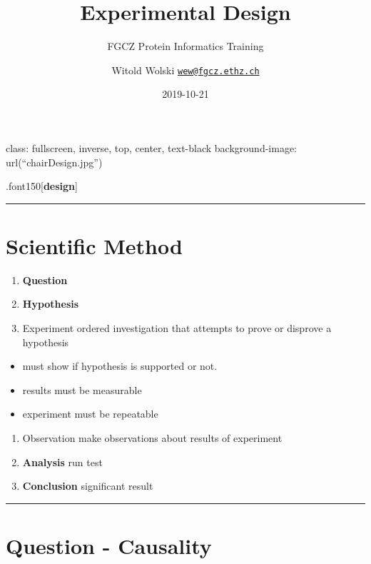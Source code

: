 \documentclass[]{article}
\title{Experimental Design}
\subtitle{FGCZ Protein Informatics Training}
\author{Witold Wolski
\href{mailto:wew@fgcz.ethz.ch}{\nolinkurl{wew@fgcz.ethz.ch}}}
\date{2019-10-21}
\providecommand{\tightlist}{%
  \setlength{\itemsep}{0pt}\setlength{\parskip}{0pt}}
\begin{document}
\maketitle

class: fullscreen, inverse, top, center, text-black background-image:
url(``chairDesign.jpg'')

.font150{[}\textbf{design}{]}

\begin{center}\rule{0.5\linewidth}{\linethickness}\end{center}

\hypertarget{scientific-method}{%
\section{Scientific Method}\label{scientific-method}}

\begin{enumerate}
\def\labelenumi{\arabic{enumi}.}
\tightlist
\item
  \textbf{Question}
\item
  \textbf{Hypothesis}
\item
  Experiment ordered investigation that attempts to prove or disprove a
  hypothesis
\end{enumerate}

\begin{itemize}
\tightlist
\item
  must show if hypothesis is supported or not.
\item
  results must be measurable
\item
  experiment must be repeatable
\end{itemize}

\begin{enumerate}
\def\labelenumi{\arabic{enumi}.}
\setcounter{enumi}{3}
\tightlist
\item
  Observation make observations about results of experiment
\item
  \textbf{Analysis} run test
\item
  \textbf{Conclusion} significant result
\end{enumerate}

\begin{center}\rule{0.5\linewidth}{\linethickness}\end{center}

\hypertarget{question---causality}{%
\section{Question - Causality}\label{question---causality}}
\end{document}
